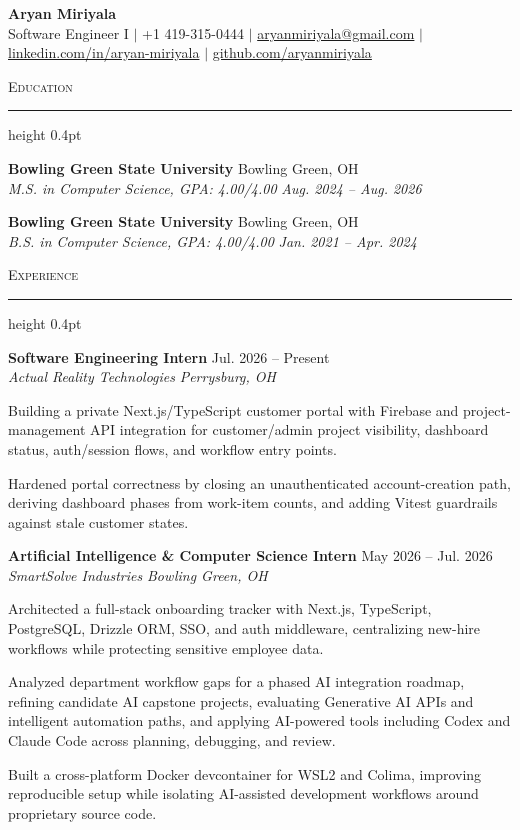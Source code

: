 \documentclass[letterpaper,11pt]{article}
\newcommand{\resumesection}[1]{%
  \par\vspace{2pt}%
  {\large\scshape #1}\par\vspace{2pt}%
  \hrule height 0.4pt\vspace{2pt}%
}
\newcommand{\resumeSubheading}[4]{
  \textbf{#1} \hfill #2\\
  \textit{#3} \hfill \textit{#4}
}
\begin{document}
\begin{center}
  {\LARGE \textbf{Aryan Miriyala}}\\[-1pt]
  \small
  Software Engineer I $|$
  +1 419-315-0444 $|$
  \href{mailto:aryanmiriyala@gmail.com}{aryanmiriyala@gmail.com} $|$
  \href{https://www.linkedin.com/in/aryan-miriyala-7788a21b6/}{linkedin.com/in/aryan-miriyala} $|$
  \href{https://github.com/aryanmiriyala}{github.com/aryanmiriyala}
\end{center}\vspace{-10pt}

\resumesection{Education}
\resumeSubheading
{Bowling Green State University}{Bowling Green, OH}
{M.S. in Computer Science, GPA: 4.00/4.00}{Aug. 2024 -- Aug. 2026}

\resumeSubheading
{Bowling Green State University}{Bowling Green, OH}
{B.S. in Computer Science, GPA: 4.00/4.00}{Jan. 2021 -- Apr. 2024}

\resumesection{Experience}
\resumeSubheading
{Software Engineering Intern}{Jul. 2026 -- Present}
{Actual Reality Technologies}{Perrysburg, OH}
\begin{tightitemize}
  \item Building a private Next.js/TypeScript customer portal with Firebase and project-management API integration for customer/admin project visibility, dashboard status, auth/session flows, and workflow entry points.
  \item Hardened portal correctness by closing an unauthenticated account-creation path, deriving dashboard phases from work-item counts, and adding Vitest guardrails against stale customer states.
\end{tightitemize}

\resumeSubheading
{Artificial Intelligence \& Computer Science Intern}{May 2026 -- Jul. 2026}
{SmartSolve Industries}{Bowling Green, OH}
\begin{tightitemize}
  \item Architected a full-stack onboarding tracker with Next.js, TypeScript, PostgreSQL, Drizzle ORM, SSO, and auth middleware, centralizing new-hire workflows while protecting sensitive employee data.
  \item Analyzed department workflow gaps for a phased AI integration roadmap, refining candidate AI capstone projects, evaluating Generative AI APIs and intelligent automation paths, and applying AI-powered tools including Codex and Claude Code across planning, debugging, and review.
  \item Built a cross-platform Docker devcontainer for WSL2 and Colima, improving reproducible setup while isolating AI-assisted development workflows around proprietary source code.
\end{tightitemize}
\end{document}
